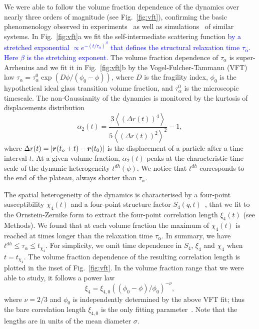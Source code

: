 We were able to follow the volume fraction dependence of the dynamics over nearly three orders of magnitude (see Fig.~\ref{fig:vft}), confirming the basic phenomenology observed in experiments~\citep{pusey1987ogt, kegel2000swe, weeks2000, BerthierR} as well as simulations~\citep{tanaka2010critical} of similar systems. In Fig.~\ref{fig:vft}a we fit the self-intermediate scattering function \textcolor{blue}{by a stretched exponential $\propto e^{-(t/\tau_\alpha)^\beta}$ that defines the structural relaxation time $\tau_\alpha$. 
Here $\beta$ is the stretching exponent.} The volume fraction dependence of $\tau_\alpha$ is super-Arrhenius and we fit it in Fig.~\ref{fig:vft}b by the Vogel-Fulcher-Tammann (VFT) law $\tau_\alpha=\tau_\alpha^0 \exp(D\phi/(\phi_0-\phi))$, where $D$ is the fragility index, $\phi_0$ is the hypothetical ideal glass transition volume fraction, and $\tau_\alpha^0$ is the microscopic timescale. The non-Gaussianity of the dynamics is monitored by the kurtosis of displacements distribution 
\begin{equation}
	\alpha_2(t) = \frac{3 \left\langle {(\Delta r(t))^4} \right\rangle}{5 {\left\langle {(\Delta r(t))^2} \right\rangle}^2}-1, 
	\label{eq:ng}
\end{equation}
where $\Delta r(t)= |\mbox{\boldmath$r$}(t_o+t)- \mbox{\boldmath$r$}(t_0)|$ is the displacement of
a particle after a time interval $t$. 
At a given volume fraction, $\alpha_2(t)$ peaks at the characteristic time scale of the dynamic heterogeneity $t^{dh}(\phi)$. We notice that $t^{dh}$ corresponds to the end of the plateau, always shorter than $\tau_\alpha$.

The spatial heterogeneity of the dynamics is characterised by a four-point susceptibility $\chi_4(t)$ and a four-point structure factor $S_4(q,t)$~\cite{Flenner2011}, that we fit to the Ornstein-Zernike form to extract the four-point correlation length $\xi_4(t)$ (see Methods). We found that at each volume fraction the maximum of $\chi_4(t)$ is reached at times longer than the relaxation time $\tau_\alpha$. In summary, we have
$t^{dh} \leq \tau_\alpha \leq t_{\chi_4}$.
For simplicity, we omit time dependence in $S_4$, $\xi_4$ and $\chi_4$ when $t=t_{\chi_4}$. The volume fraction dependence of the resulting correlation length is plotted in the inset of Fig.~\ref{fig:vft}. In the volume fraction range that we were able to study, it follows a power law
\begin{equation}
\xi_{4} =\xi_{4,0} ((\phi_0-\phi)/\phi_0)^{-\nu},
\label{eq:xi4ofphi}
\end{equation}
where $\nu=2/3$ and $\phi_0$ is independently determined by the above VFT fit; thus the bare correlation length $\xi_{4,0}$ is the only fitting parameter~\citep{tanaka2010critical}. Note that the lengths are in units of the mean diameter $\sigma$. 


